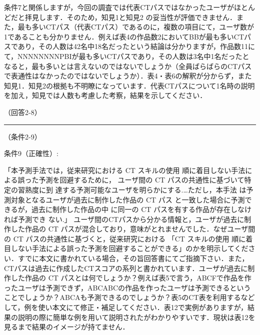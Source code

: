 \documentclass{jarticle} %
\def\subsection#1{ \vspace{1pc} {\gt #1} }
\def\nextans{ \vspace{2pc} \hrule }
\begin{document}
条件7と関係しますが，今回の調査では代表CTパスではなかったユーザがほとんどだと拝見します．そのため，知見1と知見2 の妥当性が評価できません．また，最も多いCTパス（代表CTパス）であるのに，複数の項目にて，ユーザ数が1であることも分かりません．例えば表4の作品数2においてBBが最も多いCTパスであり，その人数は42名中18名だったという結論は分かりますが，作品数11にて，NNNNNNNNPBIが最も多いCTパスであり，その人数は3名中1名だったとなると，最も多いとは言えないのではないでしょうか（全員ばらばらのCTパスで表通性はなかったのではないでしょうか）．表4・表6の解釈が分からず，また知見1．知見2の根拠も不明瞭になっています．代表CTパスについて1名時の説明を加え，知見では人数も考慮した考察，結果を示してください．

\subsection{（回答2-8）}


\newpage
\nextans
\subsection{（条件2-9）}

条件9（正確性）: 

「本予測手法では，従来研究における CT スキルの使用 順に着目しない手法による誤った予測を回避するために， ユーザ間の CT パスの共通性に基づいて特定の習熟度に到 達する予測可能なユーザを明らかにする.…ただし，本手法 は予測対象となるユーザが過去に制作した作品の CT パス と一致した場合に予測できるが，過去に制作した作品の中 に同一の CT パスを有する作品が存在しなければ予測でき ない.」
ユーザ間のCTパスから分かる情報と，ユーザが過去に制作した作品の CT パスが混合しており，意味がとれませんでした．なぜユーザ間の CT パスの共通性に基づくと，従来研究における 「CT スキルの使用 順に着目しない手法による誤った予測を回避することができる」のかを明示してください．すでに本文に書かれている場合，その旨回答書にてご指摘下さい．また，CTパスは過去に作成したCTスコアの系列と書かれています．ユーザが過去に制作した作品の CT パスとは何でしょうか？例えば表5で言う，ABCFで作品を作ったユーザは予測できず，ABCABCの作品を作ったユーザは予測できるということでしょうか？ABCAも予測できるのでしょうか？表5のCT表を利用するなどして，例を使い本文にて修正・補足してください．表12で実例がありますが，結果の説明の際に簡単な例を用いて説明されたがわかりやすいです．現状は表12を見るまで結果のイメージが持てません．
\end{document}
